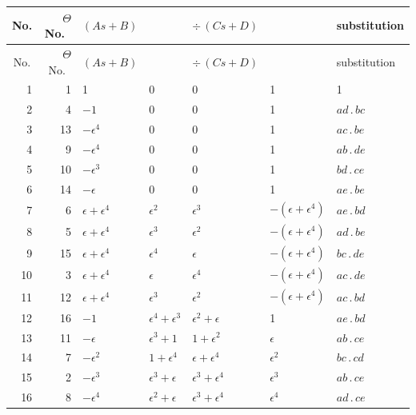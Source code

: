 \documentclass[11pt,a4paper]{article}
\begin{document}
\begin{center}
\footnotesize
\begin{longtable}{r|r|l|l|l|l|l}
\multicolumn{1}{c|}{No.} & $\Theta$ No.\
 & $(A s + B)$ & & $\div\,(C s + D)$ & & substitution\\\hline
\endfirsthead
\multicolumn{1}{c|}{No.} & $\Theta$ No.\
 & $(A s + B)$ & & $\div\,(C s + D)$ & & substitution\\\hline
\endhead
1  & 1  & 1                          & 0 & 0 & 1 & 1\\
2  & 4  & $-1$                       & 0 & 0 & 1 & $ad\,.\,bc$\\
3  & 13 & $-\epsilon^{4}$            & 0 & 0 & 1 & $ac\,.\,be$\\
4  & 9  & $-\epsilon^{4}$            & 0 & 0 & 1 & $ab\,.\,de$\\
5  & 10 & $-\epsilon^{3}$            & 0 & 0 & 1 & $bd\,.\,ce$\\
6  & 14 & $-\epsilon$                & 0 & 0 & 1 & $ae\,.\,be$\\
7  & 6  & $\epsilon + \epsilon^{4}$  & $\epsilon^{2}$ & $\epsilon^{3}$
                                     & $-(\epsilon + \epsilon^{4})$ & $ae\,.\,bd$\\
8  & 5  & $\epsilon + \epsilon^{4}$  & $\epsilon^{3}$ & $\epsilon^{2}$
                                     & $-(\epsilon + \epsilon^{4})$ & $ad\,.\,be$\\
9  & 15 & $\epsilon + \epsilon^{4}$  & $\epsilon^{4}$ & $\epsilon$
                                     & $-(\epsilon + \epsilon^{4})$ & $bc\,.\,de$\\
10 & 3  & $\epsilon + \epsilon^{4}$  & $\epsilon$ & $\epsilon^{4}$
                                     & $-(\epsilon + \epsilon^{4})$ & $ac\,.\,de$\\
11 & 12 & $\epsilon + \epsilon^{4}$  & $\epsilon^{3}$ & $\epsilon^{2}$
                                     & $-(\epsilon + \epsilon^{4})$ & $ac\,.\,bd$\\
12 & 16 & $-1$                       & $\epsilon^{4} + \epsilon^{3}$
                                     & $\epsilon^{2} + \epsilon$ & 1 & $ae\,.\,bd$\\
13 & 11 & $-\epsilon$                & $\epsilon^{3} + 1$
                                     & $1 + \epsilon^{2}$ & $\epsilon$ & $ab\,.\,ce$\\
14 & 7  & $-\epsilon^{2}$            & $1 + \epsilon^{4}$
                                     & $\epsilon + \epsilon^{4}$ & $\epsilon^{2}$ & $bc\,.\,cd$\\
15 & 2  & $-\epsilon^{3}$            & $\epsilon^{3} + \epsilon$
                                     & $\epsilon^{3} + \epsilon^{4}$ & $\epsilon^{3}$ & $ab\,.\,ce$\\
16 & 8  & $-\epsilon^{4}$            & $\epsilon^{2} + \epsilon$
                                     & $\epsilon^{3} + \epsilon^{4}$ & $\epsilon^{4}$ & $ad\,.\,ce$\\


\end{longtable}
\end{center}
\end{document}
